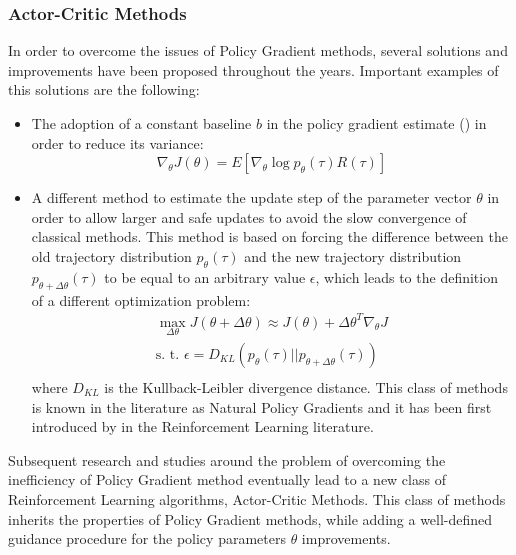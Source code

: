             \subsubsection{Actor-Critic Methods}    
                In order to overcome the issues of Policy Gradient methods, several solutions and improvements have been proposed throughout the years. Important examples of this solutions are the following:
                \begin{itemize}
                    \item The adoption of a constant baseline $b$ in the policy gradient estimate () in order to reduce its variance:
                    \[ \nabla_{\theta} J(\theta) = E \left[ \nabla_{\theta} \log p_{\theta}(\tau) R(\tau) \right] \]
                    \item  A different method to estimate the update step of the parameter vector $\theta$ in order to allow larger and safe updates to avoid the slow convergence of classical methods. This method is based on forcing the difference between the old trajectory distribution $p_{\theta}(\tau)$ and the new trajectory distribution $p_{\theta + \Delta\theta}(\tau)$ to be equal to an arbitrary value $\epsilon$, which leads to the definition of a different optimization problem:
                    \begin{align*}  
                        \max_{\Delta\theta} J(\theta + \Delta\theta) \approx J (\theta) + \Delta\theta^{T}\nabla_{\theta}J\\
                        \text{s. t. } \epsilon = D_{KL} \left( p_{\theta}(\tau)||p_{\theta + \Delta\theta}(\tau)\right) \\
                    \end{align*}
                    where $D_{KL}$ is the Kullback-Leibler divergence distance. This class of methods is known in the literature as Natural Policy Gradients and it has been first introduced by  in the Reinforcement Learning literature.
                \end{itemize}
                Subsequent research and studies around the problem of overcoming the inefficiency of Policy Gradient method eventually lead to a new class of Reinforcement Learning algorithms, Actor-Critic Methods. This class of methods inherits the properties of Policy Gradient methods, while adding a well-defined guidance procedure for the policy parameters $\theta$ improvements. \newline
